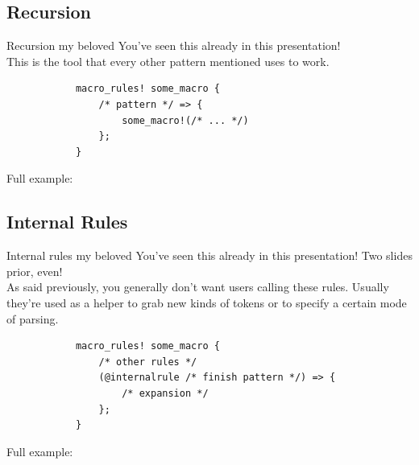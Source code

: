 \documentclass{beamer}
\begin{document}
	\subsection{Recursion}
	\begin{frame}[fragile]{Recursion my beloved}
		You've seen this already in this presentation! \\

		This is the tool that every other pattern mentioned uses to work.

		\begin{verbatim}
			macro_rules! some_macro {
				/* pattern */ => {
					some_macro!(/* ... */)
				};
			}
		\end{verbatim}

		Full example: 
	\end{frame}

	\subsection{Internal Rules}
	\begin{frame}[fragile]{Internal rules my beloved}
		You've seen this already in this presentation! Two slides prior, even! \\

		As said previously, you generally don't want users calling these rules. Usually they're used
		as a helper to grab new kinds of tokens or to specify a certain mode of parsing.

		\begin{verbatim}
			macro_rules! some_macro {
				/* other rules */
				(@internalrule /* finish pattern */) => {
					/* expansion */
				};
			}
		\end{verbatim}

		Full example: 
	\end{frame}
\end{document}
